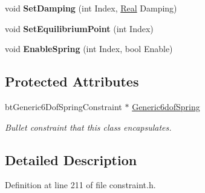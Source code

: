 \begin{DoxyCompactItemize}
\item 
\hypertarget{classphys_1_1Generic6DofSpringConstraint_a045ada78452b640730d93b1a55a07ed0}{
void {\bfseries SetDamping} (int Index, \hyperlink{namespacephys_af7eb897198d265b8e868f45240230d5f}{Real} Damping)}
\label{d1/dc7/classphys_1_1Generic6DofSpringConstraint_a045ada78452b640730d93b1a55a07ed0}

\item 
\hypertarget{classphys_1_1Generic6DofSpringConstraint_a2a7fac22f3e47671c66bfd0fea085544}{
void {\bfseries SetEquilibriumPoint} (int Index)}
\label{d1/dc7/classphys_1_1Generic6DofSpringConstraint_a2a7fac22f3e47671c66bfd0fea085544}

\item 
\hypertarget{classphys_1_1Generic6DofSpringConstraint_ad25cb82744be6045c53d41fe6fb33051}{
void {\bfseries EnableSpring} (int Index, bool Enable)}
\label{d1/dc7/classphys_1_1Generic6DofSpringConstraint_ad25cb82744be6045c53d41fe6fb33051}

\end{DoxyCompactItemize}
\subsection*{Protected Attributes}
\begin{DoxyCompactItemize}
\item 
\hypertarget{classphys_1_1Generic6DofSpringConstraint_aaa3b34568d2402155270c102e4719c07}{
btGeneric6DofSpringConstraint $\ast$ \hyperlink{classphys_1_1Generic6DofSpringConstraint_aaa3b34568d2402155270c102e4719c07}{Generic6dofSpring}}
\label{d1/dc7/classphys_1_1Generic6DofSpringConstraint_aaa3b34568d2402155270c102e4719c07}

\begin{DoxyCompactList}\small\item\em Bullet constraint that this class encapsulates. \item\end{DoxyCompactList}\end{DoxyCompactItemize}


\subsection{Detailed Description}


Definition at line 211 of file constraint.h.



